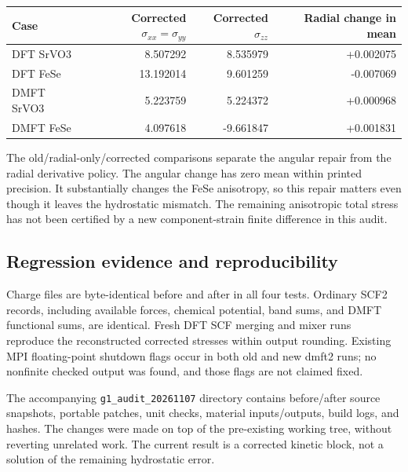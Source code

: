 \documentclass[11pt]{article}
\begin{document}
\begin{center}\small\begin{tabular}{lrrr}\toprule

Case & Corrected $\sigma_{xx}=\sigma_{yy}$ & Corrected $\sigma_{zz}$ & Radial change in mean\\\midrule

DFT SrVO3 & 8.507292 & 8.535979 & +0.002075\\

DFT FeSe & 13.192014 & 9.601259 & -0.007069\\

DMFT SrVO3 & 5.223759 & 5.224372 & +0.000968\\

DMFT FeSe & 4.097618 & -9.661847 & +0.001831\\

\bottomrule\end{tabular}\end{center}

The old/radial-only/corrected comparisons separate the angular repair from the radial derivative policy. The angular change has zero mean within printed precision. It substantially changes the FeSe anisotropy, so this repair matters even though it leaves the hydrostatic mismatch. The remaining anisotropic total stress has not been certified by a new component-strain finite difference in this audit.

\subsection{Regression evidence and reproducibility}

Charge files are byte-identical before and after in all four tests. Ordinary SCF2 records, including available forces, chemical potential, band sums, and DMFT functional sums, are identical. Fresh DFT SCF merging and mixer runs reproduce the reconstructed corrected stresses within output rounding. Existing MPI floating-point shutdown flags occur in both old and new dmft2 runs; no nonfinite checked output was found, and those flags are not claimed fixed.

The accompanying \texttt{g1\_audit\_20261107} directory contains before/after source snapshots, portable patches, unit checks, material inputs/outputs, build logs, and hashes. The changes were made on top of the pre-existing working tree, without reverting unrelated work. The current result is a corrected kinetic block, not a solution of the remaining hydrostatic error.
\end{document}
